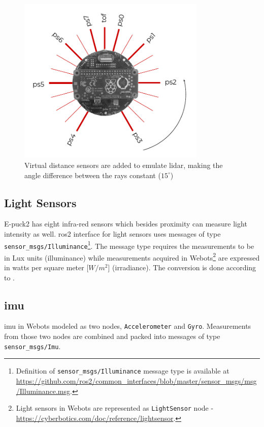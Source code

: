 \begin{figure}[H]
    \centering
    \includegraphics[width=0.8\textwidth]{simulation/figures/laserscan.pdf}
    \caption{Virtual distance sensors are added to emulate \ac{lidar}, making the angle difference between the rays constant ($15^\circ$)}
    \label{fig:simulation:laserscan}
\end{figure}

\subsection{Light Sensors}
E-puck2 has eight infra-red sensors which besides proximity can measure light intensity as well.
\ac{ros2} interface for light sensors uses messages of type \texttt{sensor\_msgs/Illuminance}\footnote{Definition of \texttt{sensor\_msgs/Illuminance} message type is available at \url{https://github.com/ros2/common_interfaces/blob/master/sensor_msgs/msg/Illuminance.msg}.}.
The message type requires the measurements to be in Lux units (illuminance) while measurements acquired in Webots\footnote{Light sensors in Webots are represented as \texttt{LightSensor} node - \url{https://cyberbotics.com/doc/reference/lightsensor}.} are expressed in watts per square meter [$W/m^2$] (irradiance). 
The conversion is done according to \cite{michael_conversion_2019}.

\subsection{\acl{imu}}
\ac{imu} in Webots modeled as two nodes, \texttt{Accelerometer} and \texttt{Gyro}.
Measurements from those two nodes are combined and packed into messages of type \texttt{sensor\_msgs/Imu}.


